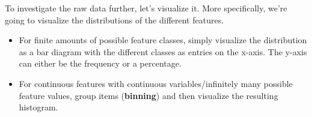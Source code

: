 To investigate the raw data further, let's visualize it. More specifically, we're going to visualize the distributions of the different features.
\begin{itemize}
  \item For finite amounts of possible feature classes, simply visualize the distribution as a bar diagram with the different classes as entries on the x-axis. The y-axis can either be the frequency or a percentage.
  \item For continuous features with continuous variables/infinitely many possible feature values, group items (\textbf{binning}) and then visualize the resulting histogram.
\end{itemize}


